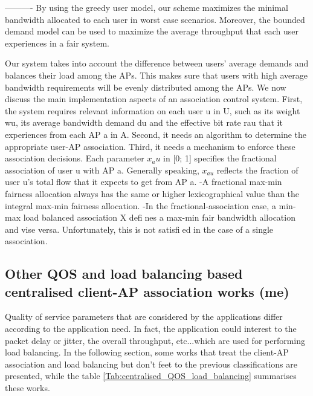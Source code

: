 \documentclass[journal,transmag]{IEEEtran}
\begin{document}
----------
By using the greedy user model, our scheme maximizes the minimal bandwidth allocated to each user in worst case scenarios. Moreover, the bounded demand model can be used to maximize the average throughput that each user experiences in a fair system.

Our system takes into account the difference between users' average demands and balances their load among the APs. This makes sure that users with high average bandwidth requirements will be evenly distributed among the APs.
We now discuss the main implementation aspects of an association control system. First, the system requires relevant information on each user u in U, such as its weight wu, its average bandwidth demand du and the effective bit rate rau that it experiences from each AP a in A. Second, it needs an algorithm to determine the appropriate user-AP association. Third, it needs a mechanism to enforce these association decisions.
Each parameter $x_au$ in [0; 1] specifies the fractional association of user u with AP a. Generally
speaking, $x_{au}$ reflects the fraction of user u's total flow that it expects to get from AP a.
-A fractional max-min fairness allocation always has the same or higher lexicographical value
than the integral max-min fairness allocation.
-In the fractional-association case, a min-max load balanced association X defines a max-min fair bandwidth allocation and vise versa. Unfortunately, this is not satisfied in the case of a single association. 


\subsection{Other QOS and load balancing based centralised client-AP association works (me)}
Quality of service parameters that are considered by the applications differ according to the application need. In fact, the application could interest to the packet delay or jitter, the overall throughput, etc...which are used for performing load balancing. In the following section, some works that treat the client-AP association and load balancing but don't feet to the previous classifications are presented, while the table \ref{Tab:centralised_QOS_load_balancing} summarises these works.  
\end{document}
